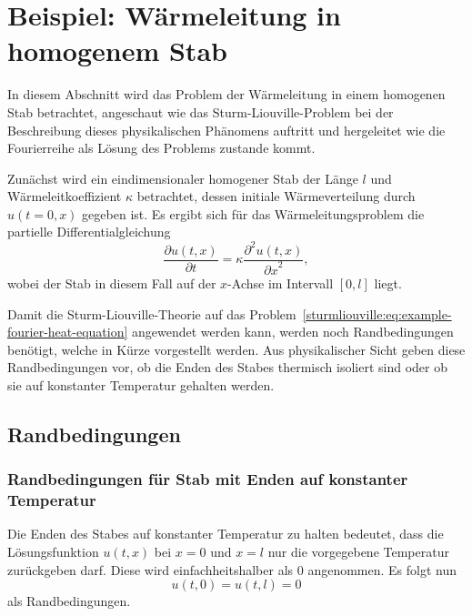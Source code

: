 %
%
%

\section{Beispiel: Wärmeleitung in homogenem Stab}

In diesem Abschnitt wird das Problem der Wärmeleitung in einem homogenen Stab
betrachtet, angeschaut wie das Sturm-Liouville-Problem bei der Beschreibung
dieses physikalischen Phänomens auftritt und hergeleitet wie die Fourierreihe
als Lösung des Problems zustande kommt.

Zunächst wird ein eindimensionaler homogener Stab der Länge $l$ und
Wärmeleitkoeffizient $\kappa$ betrachtet, dessen initiale Wärmeverteilung durch
$u(t=0, x)$ gegeben ist.
Es ergibt sich für das Wärmeleitungsproblem die partielle Differentialgleichung
\begin{equation}
    \label{sturmliouville:eq:example-fourier-heat-equation}
    \frac{\partial u(t, x)}{\partial t} =
    \kappa \frac{\partial^{2}u(t, x)}{{\partial x}^{2}},
\end{equation}
wobei der Stab in diesem Fall auf der $x$-Achse im Intervall $[0,l]$ liegt.

Damit die Sturm-Liouville-Theorie auf das
Problem~\eqref{sturmliouville:eq:example-fourier-heat-equation} angewendet
werden kann, werden noch Randbedingungen benötigt, welche in Kürze
vorgestellt werden.
Aus physikalischer Sicht geben diese Randbedingungen vor, ob die Enden des
Stabes thermisch isoliert sind oder ob sie auf konstanter Temperatur gehalten
werden.

%
%
\subsection{Randbedingungen}
\subsubsection{Randbedingungen für Stab mit Enden auf konstanter Temperatur}
%
Die Enden des Stabes auf konstanter Temperatur zu halten bedeutet, dass die
Lösungsfunktion $u(t,x)$ bei $x = 0$ und $x = l$ nur die vorgegebene
Temperatur zurückgeben darf. Diese wird einfachheitshalber als $0$ angenommen.
Es folgt nun
\begin{equation}
    \label{sturmliouville:eq:example-fourier-boundary-condition-ends-constant}
    u(t,0)
    =
    u(t,l)
    =
    0
\end{equation}
als Randbedingungen.

